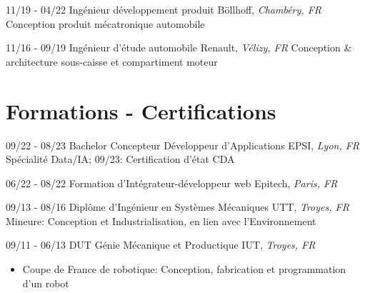 \documentclass[]{friggeri-cv}
\begin{document}
\begin{entrylist}
  \entry
    {11/19 - 04/22}
    {Ingénieur développement produit}
    {Böllhoff, \textit{Chambéry, FR}}
    {Conception produit mécatronique automobile}
\end{entrylist}
\vspace{0.5mm}

\begin{entrylist}
  \entry
    {11/16 - 09/19}
    {Ingénieur d'étude automobile}
    {Renault, \textit{Vélizy, FR}}
    {Conception \& architecture sous-caisse et compartiment moteur}
\end{entrylist}
\vspace*{-0.5cm}
\vspace*{0.45cm}
\section{Formations - Certifications}
\vspace*{-0.25cm}
\vspace{0.5mm}
    \begin{entrylist}
    \entry
        {09/22 - 08/23}
        {Bachelor Concepteur Développeur d'Applications}
        {EPSI, \textit{Lyon, FR}}
        {Spécialité Data/IA; \hspace{7mm} 09/23: Certification d'état CDA}
    \end{entrylist}
    \vspace{0.5mm}
\begin{entrylist}
\entry
    {06/22 - 08/22}
    {Formation d'Intégrateur-développeur web}
    {Epitech, \textit{Paris, FR}}
    {}
\end{entrylist}
\vspace{0.5mm}
    \begin{entrylist}
    \entry
        {09/13 - 08/16}
        {Diplôme d'Ingénieur en Systèmes Mécaniques}
        {UTT, \textit{Troyes, FR}}
        {Mineure: Conception et Industrialisation, en lien avec l’Environnement}
    \end{entrylist}
    \vspace{0.5mm}
\begin{entrylist}
\entry
    {09/11 - 06/13}
    {DUT Génie Mécanique et Productique}
    {IUT, \textit{Troyes, FR}}
    {}
\end{entrylist}
\vspace*{-0.7cm}
\begin{itemize}
\setlength{\itemsep}{1pt}
\setlength{\parskip}{0pt}
\setlength{\parsep}{0pt}
\item Coupe de France de robotique: Conception, fabrication et programmation d’un robot
\end{itemize}
\end{document}
